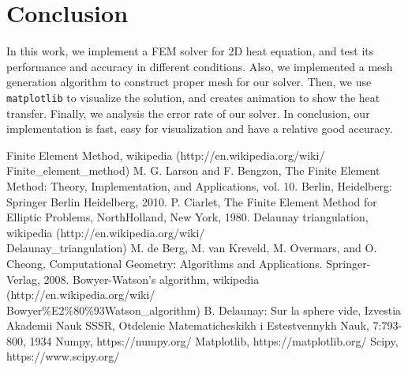 \documentclass[conference]{IEEEtran}
\begin{document}
\section{Conclusion}
In this work, we implement a FEM solver for 2D heat equation, and test its performance and accuracy in 
different conditions. Also, we implemented a mesh generation algorithm to construct proper mesh for 
our solver. Then, we use \texttt{matplotlib}\cite{b9} to visualize the solution, and creates animation to show 
the heat transfer. Finally, we analysis the error rate of our solver. In conclusion, our implementation 
is fast, easy for visualization and have a relative good accuracy.

\newpage
\begin{thebibliography}{00}
 Finite Element Method, wikipedia (http://en.wikipedia.org/wiki/\\Finite\_element\_method)
 M. G. Larson and F. Bengzon, The Finite Element Method: Theory, Implementation, and Applications, vol. 10. Berlin, Heidelberg: Springer Berlin Heidelberg, 2010.
 P. Ciarlet, The Finite Element Method for Elliptic Problems, NorthHolland, New York, 1980.
 Delaunay triangulation, wikipedia (http://en.wikipedia.org/wiki/\\Delaunay\_triangulation)
 M. de Berg, M. van Kreveld, M. Overmars, and O. Cheong, Computational Geometry: Algorithms and Applications. Springer-Verlag, 2008.
 Bowyer-Watson's algorithm, wikipedia (http://en.wikipedia.org/wiki/\\Bowyer\%E2\%80\%93Watson\_algorithm)
 B. Delaunay: Sur la sphere vide, Izvestia Akademii Nauk SSSR, Otdelenie Matematicheskikh i Estestvennykh Nauk, 7:793-800, 1934
 Numpy, https://numpy.org/
 Matplotlib, https://matplotlib.org/
 Scipy, https://www.scipy.org/
\end{thebibliography}
\end{document}
